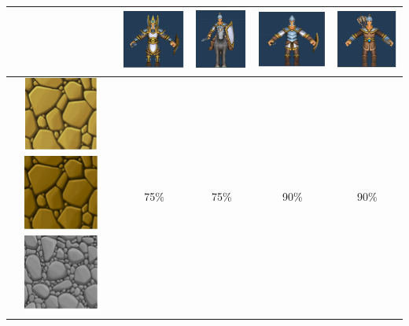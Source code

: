 \begin{table}[H]
    \centering
    \begin{tabular}{|c|c|c|c|c|}
        \cline{2-5}        
        \multicolumn{1}{c|}{} & \includegraphics{imagesTable/infanteria} & \includegraphics{imagesTable/caballo} & \includegraphics{imagesTable/lancero} & \includegraphics{imagesTable/arquero} \\
        \hline
        \includegraphics{imagesTable/claroPiedra} \includegraphics{imagesTable/piedra} \includegraphics{imagesTable/grisPiedra} & 75\% & 75\% & 90\% & 90\% \\

\end{tabular}
\end{table}
